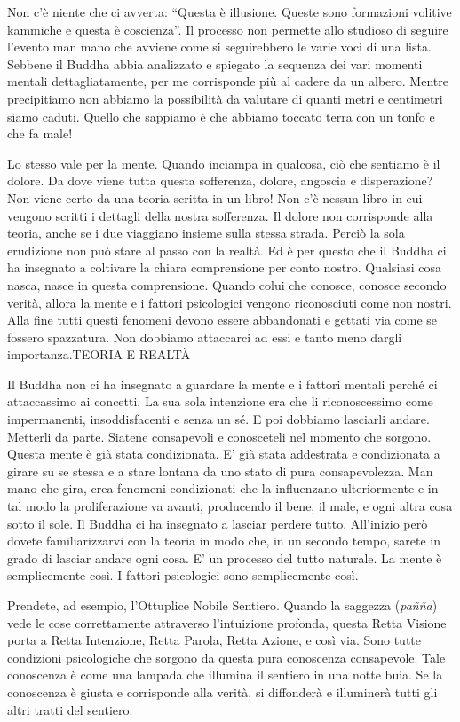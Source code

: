 Non c'è niente che ci avverta: ``Questa è illusione. Queste sono
formazioni volitive kammiche e questa è coscienza''. Il processo non
permette allo studioso di seguire l'evento man mano che avviene come si
seguirebbero le varie voci di una lista. Sebbene il Buddha abbia
analizzato e spiegato la sequenza dei vari momenti mentali
dettagliatamente, per me corrisponde più al cadere da un albero. Mentre
precipitiamo non abbiamo la possibilità da valutare di quanti metri e
centimetri siamo caduti. Quello che sappiamo è che abbiamo toccato terra
con un tonfo e che fa male!

Lo stesso vale per la mente. Quando inciampa in qualcosa, ciò che
sentiamo è il dolore. Da dove viene tutta questa sofferenza, dolore,
angoscia e disperazione? Non viene certo da una teoria scritta in un
libro! Non c'è nessun libro in cui vengono scritti i dettagli della
nostra sofferenza. Il dolore non corrisponde alla teoria, anche se i due
viaggiano insieme sulla stessa strada. Perciò la sola erudizione non può
stare al passo con la realtà. Ed è per questo che il Buddha ci ha
insegnato a coltivare la chiara comprensione per conto nostro. Qualsiasi
cosa nasca, nasce in questa comprensione. Quando colui che conosce,
conosce secondo verità, allora la mente e i fattori psicologici vengono
riconosciuti come non nostri. Alla fine tutti questi fenomeni devono
essere abbandonati e gettati via come se fossero spazzatura. Non
dobbiamo attaccarci ad essi e tanto meno dargli importanza.TEORIA E
REALTÀ

Il Buddha non ci ha insegnato a guardare la mente e i fattori mentali
perché ci attaccassimo ai concetti. La sua sola intenzione era che li
riconoscessimo come impermanenti, insoddisfacenti e senza un sé. E poi
dobbiamo lasciarli andare. Metterli da parte. Siatene consapevoli e
conosceteli nel momento che sorgono. Questa mente è già stata
condizionata. E' già stata addestrata e condizionata a girare su se
stessa e a stare lontana da uno stato di pura consapevolezza. Man mano
che gira, crea fenomeni condizionati che la influenzano ulteriormente e
in tal modo la proliferazione va avanti, producendo il bene, il male, e
ogni altra cosa sotto il sole. Il Buddha ci ha insegnato a lasciar
perdere tutto. All'inizio però dovete familiarizzarvi con la teoria in
modo che, in un secondo tempo, sarete in grado di lasciar andare ogni
cosa. E' un processo del tutto naturale. La mente è semplicemente così.
I fattori psicologici sono semplicemente così.

Prendete, ad esempio, l'Ottuplice Nobile Sentiero. Quando la saggezza
(\emph{pañña}) vede le cose correttamente attraverso l'intuizione
profonda, questa Retta Visione porta a Retta Intenzione, Retta Parola,
Retta Azione, e così via. Sono tutte condizioni psicologiche che sorgono
da questa pura conoscenza consapevole. Tale conoscenza è come una
lampada che illumina il sentiero in una notte buia. Se la conoscenza è
giusta e corrisponde alla verità, si diffonderà e illuminerà tutti gli
altri tratti del sentiero.

